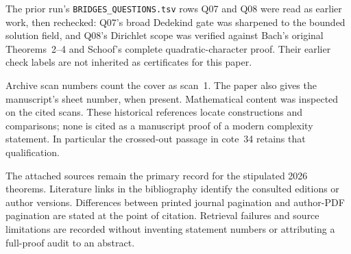 The prior run's \texttt{BRIDGES\_QUESTIONS.tsv} rows Q07 and Q08
were read as earlier work, then rechecked: Q07's broad Dedekind gate
was sharpened to the bounded solution field, and Q08's Dirichlet
scope was verified against Bach's original Theorems~2--4 and
Schoof's complete quadratic-character proof. Their earlier check
labels are not inherited as certificates for this paper.

Archive scan numbers count the cover as scan~1. The paper also gives
the manuscript's sheet number, when present. Mathematical content
was inspected on the cited scans. These historical references locate
constructions and comparisons; none is cited as a manuscript proof
of a modern complexity statement. In particular the crossed-out
passage in cote~34 retains that qualification.

The attached sources remain the primary record for the stipulated
2026 theorems. Literature links in the bibliography identify the
consulted editions or author versions. Differences between printed
journal pagination and author-PDF pagination are stated at the
point of citation. Retrieval failures and source limitations are
recorded without inventing statement numbers or attributing a
full-proof audit to an abstract.
